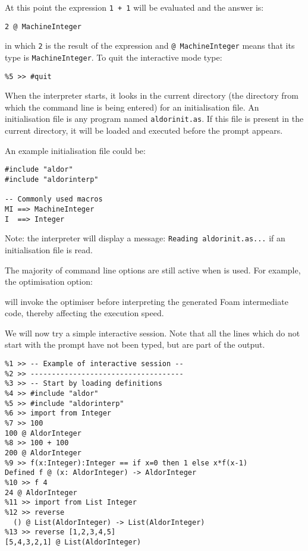 At this point the expression \verb"1 + 1" will be evaluated and the
answer is:
{\small
\begin{verbatim}
2 @ MachineInteger
\end{verbatim}
}


in which \verb"2" is the result of the expression and
\verb"@ MachineInteger" means that its type is \verb"MachineInteger".
To quit the interactive mode type:

{\small
\begin{verbatim}
%5 >> #quit
\end{verbatim}
}


When the interpreter starts, it looks in the current directory (the
directory from which the command line is being entered) for an
initialisation file. An initialisation file is any \asharp{} program
named \verb"aldorinit.as". If this file is present in the current
directory, it will be loaded and executed before the prompt appears.

An example initialisation file could be:

{\small
\begin{verbatim}
#include "aldor"
#include "aldorinterp"

-- Commonly used macros
MI ==> MachineInteger
I  ==> Integer
\end{verbatim}
}


Note: the interpreter will display a message:
\verb"Reading aldorinit.as..." if an initialisation file is read.

The majority of command line options are still active when
 is used.  For example, the optimisation option:

\begin{small}
\osprompt {}
\end{small}

will invoke the optimiser before interpreting the generated Foam
intermediate code, thereby affecting the execution speed.

We will now try a simple interactive session.
Note that all the lines which do not start with the prompt have not been
typed, but are part of the output.

{\small
\begin{verbatim}
%1 >> -- Example of interactive session --
%2 >> ------------------------------------
%3 >> -- Start by loading definitions
%4 >> #include "aldor"
%5 >> #include "aldorinterp"
%6 >> import from Integer
%7 >> 100
100 @ AldorInteger
%8 >> 100 + 100
200 @ AldorInteger
%9 >> f(x:Integer):Integer == if x=0 then 1 else x*f(x-1)
Defined f @ (x: AldorInteger) -> AldorInteger
%10 >> f 4
24 @ AldorInteger
%11 >> import from List Integer
%12 >> reverse
  () @ List(AldorInteger) -> List(AldorInteger)
%13 >> reverse [1,2,3,4,5]
[5,4,3,2,1] @ List(AldorInteger)
\end{verbatim}
}



